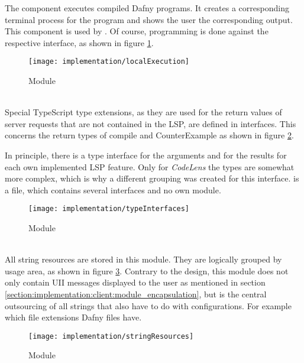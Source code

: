 The component   executes compiled Dafny programs.
It creates a corresponding terminal process
for the program and shows the user the corresponding output.
This component is used by .
Of course, programming is done against the respective interface, as shown in figure \ref{fig:localExecution}.

\begin{figure}[H]
    \centering
    \texttt{[image: implementation/localExecution]}
    \caption{Module }
    \label{fig:localExecution}
\end{figure}

\textbf{}\\
Special TypeScript type extensions,
as they are used for the return values of server requests
that are not contained in the LSP, are defined in interfaces.
This concerns the return types of compile and CounterExample as shown in figure \ref{fig:typeInterfaces}.

In principle, there is a type interface for the arguments and for the results for each own implemented LSP feature.
Only for \textit{CodeLens} the types are somewhat more complex, which is why a different grouping was created for this interface.
 is a file, which contains several interfaces and no own module.

\begin{figure}[H]
    \centering
    \texttt{[image: implementation/typeInterfaces]}
    \caption{Module }
    \label{fig:typeInterfaces}
\end{figure}

\textbf{}\\
All string resources are stored in this module.
They are logically grouped by usage area, as shown in figure \ref{fig:stringResources}.
Contrary to the design, this module does not only contain UII messages displayed to the user as mentioned in section
\ref{section:implementation:client:module_encapsulation},
but is the central outsourcing of all strings that also have to do with configurations.
For example which file extensions Dafny files have.

\begin{figure}[H]
    \centering
    \texttt{[image: implementation/stringResources]}
    \caption{Module }
    \label{fig:stringResources}
\end{figure}

